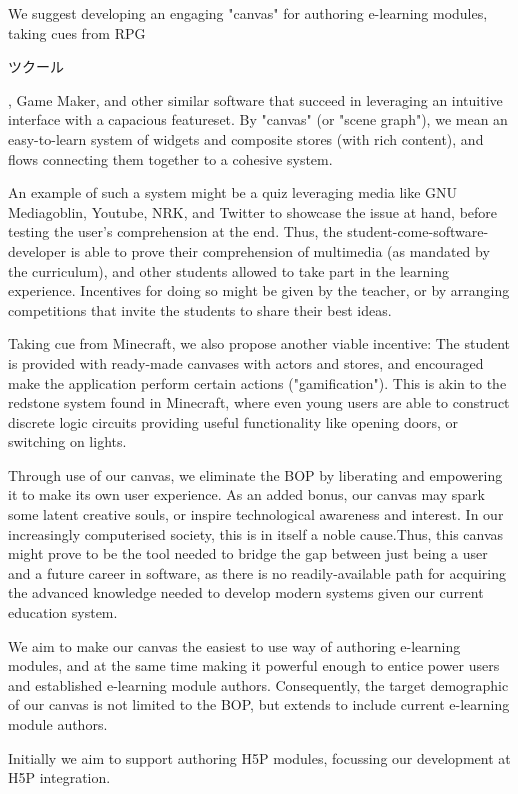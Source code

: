 We suggest developing an engaging "canvas"  for authoring e-learning modules, 
taking cues from RPG\begin{CJK}{UTF8}{min}ツクール\end{CJK}, Game Maker, and 
other similar software that succeed in leveraging an intuitive interface with 
a capacious featureset. By "canvas" (or "scene graph"), we mean an 
easy-to-learn system of widgets and composite stores (with rich content), and 
flows connecting them together to a cohesive system. 

An example of such a system might be a quiz leveraging media like GNU 
Mediagoblin, Youtube, NRK, and Twitter to showcase the issue at hand, before 
testing the user's comprehension at the end. Thus, the 
student-come-software-developer is able to prove their comprehension of 
multimedia (as mandated by the curriculum), and other students allowed to take 
part in the learning experience. Incentives for doing so might be given by the 
teacher, or by arranging competitions that invite the students to share their 
best ideas.

Taking cue from Minecraft, we also propose another viable incentive: The student
is provided with ready-made canvases with actors and stores, and encouraged make
the application perform certain actions ("gamification"). This is akin to the
redstone system found in Minecraft, where even young users are able to construct
discrete logic circuits providing useful functionality like opening doors, or
switching on lights.

Through use of our canvas, we eliminate the BOP by liberating and empowering 
it to make its own user experience. As an added bonus, our canvas may spark 
some latent creative souls, or inspire technological awareness and interest. 
In our increasingly computerised society, this is in itself a noble 
cause.Thus, this canvas might prove to be the tool needed to bridge the gap 
between just being a user and a future career in software, as there is no 
readily-available path for acquiring the advanced knowledge needed to develop 
modern systems given our current education system.

We aim to make our canvas the easiest to use way of authoring e-learning 
modules, and at the same time making it powerful enough to entice power users 
and established e-learning module authors. Consequently, the target 
demographic of our canvas is not limited to the BOP, but extends to include 
current e-learning module authors.

Initially we aim to support authoring H5P modules, focussing our development 
at H5P integration.
